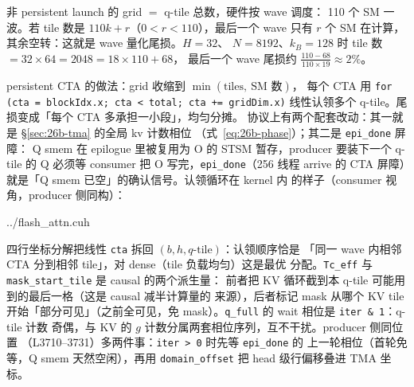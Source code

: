非 persistent launch 的 grid $=$ q-tile 总数，硬件按 wave 调度：
110 个 SM 一波。若 tile 数是 $110k + r$（$0<r<110$），最后一个 wave 只有
$r$ 个 SM 在计算，其余空转：这就是 wave 量化尾损。$H{=}32$、
$N{=}8192$、$k_B{=}128$ 时 tile 数 $= 32\times 64 = 2048 = 18\times 110 + 68$，
最后一个 wave 尾损约 $\tfrac{110-68}{110\times 19} \approx 2\%$。

persistent CTA 的做法：grid 收缩到 $\min(\text{tiles},\ \text{SM 数})$，
每个 CTA 用 \texttt{for (cta = blockIdx.x; cta < total; cta += gridDim.x)}
线性认领多个 q-tile。尾损变成「每个 CTA 多承担一小段」，均匀分摊。
协议上有两个配套改动：其一就是 \S\ref{sec:26b-tma} 的全局 kv 计数相位
（式~\eqref{eq:26b-phase}）；其二是 \texttt{epi\_\allowbreak{}done} 屏障：
Q smem 在 epilogue 里被复用为 O 的 STSM 暂存，producer 要装下一个 q-tile
的 Q 必须等 consumer 把 O 写完，\texttt{epi\_\allowbreak{}done}（256 线程
arrive 的 CTA 屏障）就是「Q smem 已空」的确认信号。认领循环在 kernel 内
的样子（consumer 视角，producer 侧同构）：

\begin{lstinputlisting}[linerange={3853-3870},firstnumber=auto,
  title={flash\_attn.cuh L3853-3870（consumer：persistent 认领循环头与 per-tile 几何量）}]{../flash_attn.cuh}
\end{lstinputlisting}

四行坐标分解把线性 \texttt{cta} 拆回 $(b, h, q\text{-tile})$：认领顺序恰是
「同一 wave 内相邻 CTA 分到相邻 tile」，对 dense（tile 负载均匀）这是最优
分配。\texttt{Tc\_eff} 与 \texttt{mask\_start\_tile} 是 causal 的两个派生量：
前者把 KV 循环截到本 q-tile 可能用到的最后一格（这是 causal 减半计算量的
来源），后者标记 mask 从哪个 KV tile 开始「部分可见」（之前全可见，免
mask）。\texttt{q\_full} 的 wait 相位是 \texttt{iter \& 1}：q-tile 计数
奇偶，与 KV 的 $g$ 计数分属两套相位序列，互不干扰。producer 侧同位置
（L3710--3731）多两件事：\texttt{iter > 0} 时先等 \texttt{epi\_done} 的
上一轮相位（首轮免等，Q smem 天然空闲），再用 \texttt{domain\_\allowbreak{}offset}
把 head 级行偏移叠进 TMA 坐标。

